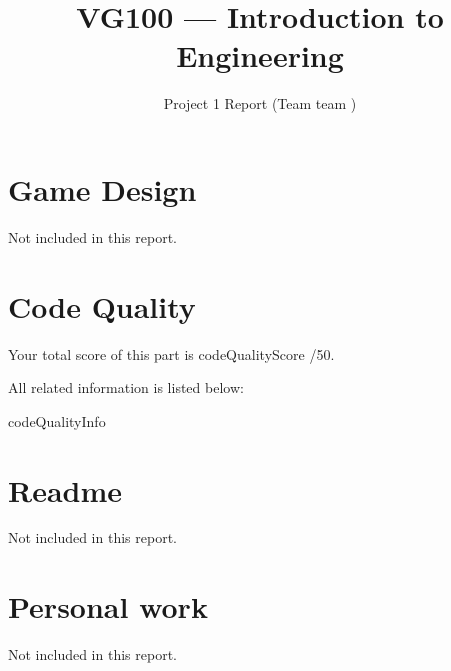 \documentclass{article}
\title{VG100 --- Introduction to\\ Engineering}
\subtitle{Project 1 Report (Team {{ team }})}
\begin{document}
\maketitle

\section{Game Design}

Not included in this report.

\section{Code Quality}

Your total score of this part is {{ codeQualityScore }}/50. \medskip

All related information is listed below: \medskip

{{ codeQualityInfo }}

\newpage

\section{Readme}

Not included in this report.

\section{Personal work}

Not included in this report.


\newpage
\end{document}
